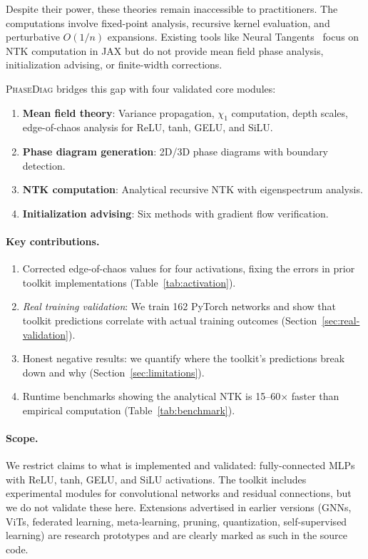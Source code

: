 \documentclass[10pt]{article}
\theoremstyle{definition}
\begin{document}
Despite their power, these theories remain inaccessible to practitioners.
The computations involve fixed-point analysis, recursive kernel evaluation, and perturbative $O(1/n)$ expansions.
Existing tools like Neural Tangents~\citep{novak2019neural} focus on NTK computation in JAX but do not provide mean field phase analysis, initialization advising, or finite-width corrections.

\textsc{PhaseDiag} bridges this gap with four validated core modules:
\begin{enumerate}[nosep]
  \item \textbf{Mean field theory}: Variance propagation, $\chi_1$ computation, depth scales, edge-of-chaos analysis for ReLU, tanh, GELU, and SiLU.
  \item \textbf{Phase diagram generation}: 2D/3D phase diagrams with boundary detection.
  \item \textbf{NTK computation}: Analytical recursive NTK with eigenspectrum analysis.
  \item \textbf{Initialization advising}: Six methods with gradient flow verification.
\end{enumerate}

\paragraph{Key contributions.}
\begin{enumerate}[nosep]
  \item Corrected edge-of-chaos values for four activations, fixing the errors in prior toolkit implementations (Table~\ref{tab:activation}).
  \item \emph{Real training validation}: We train 162 PyTorch networks and show that toolkit predictions correlate with actual training outcomes (Section~\ref{sec:real-validation}).
  \item Honest negative results: we quantify where the toolkit's predictions break down and why (Section~\ref{sec:limitations}).
  \item Runtime benchmarks showing the analytical NTK is 15--60$\times$ faster than empirical computation (Table~\ref{tab:benchmark}).
\end{enumerate}

\paragraph{Scope.}
We restrict claims to what is implemented and validated: fully-connected MLPs with ReLU, tanh, GELU, and SiLU activations.
The toolkit includes experimental modules for convolutional networks and residual connections, but we do not validate these here.
Extensions advertised in earlier versions (GNNs, ViTs, federated learning, meta-learning, pruning, quantization, self-supervised learning) are research prototypes and are clearly marked as such in the source code.
\end{document}
